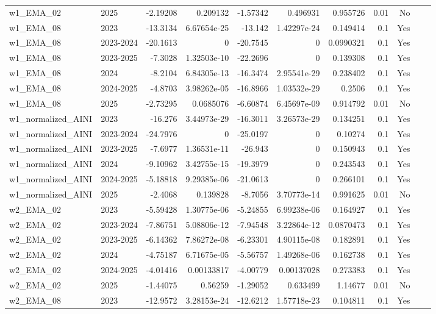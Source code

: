 \begin{longtable}{llrrrrrrrrl}
w1\_EMA\_02 & 2025 & -2.19208 & 0.209132 & -1.57342 & 0.496931 & 0.955726 & 0.01 & No \\
w1\_EMA\_08 & 2023 & -13.3134 & 6.67654e-25 & -13.142 & 1.42297e-24 & 0.149414 & 0.1 & Yes \\
w1\_EMA\_08 & 2023-2024 & -20.1613 & 0 & -20.7545 & 0 & 0.0990321 & 0.1 & Yes \\
w1\_EMA\_08 & 2023-2025 & -7.3028 & 1.32503e-10 & -22.2696 & 0 & 0.139308 & 0.1 & Yes \\
w1\_EMA\_08 & 2024 & -8.2104 & 6.84305e-13 & -16.3474 & 2.95541e-29 & 0.238402 & 0.1 & Yes \\
w1\_EMA\_08 & 2024-2025 & -4.8703 & 3.98262e-05 & -16.8966 & 1.03532e-29 & 0.2506 & 0.1 & Yes \\
w1\_EMA\_08 & 2025 & -2.73295 & 0.0685076 & -6.60874 & 6.45697e-09 & 0.914792 & 0.01 & No \\
w1\_normalized\_AINI & 2023 & -16.276 & 3.44973e-29 & -16.3011 & 3.26573e-29 & 0.134251 & 0.1 & Yes \\
w1\_normalized\_AINI & 2023-2024 & -24.7976 & 0 & -25.0197 & 0 & 0.10274 & 0.1 & Yes \\
w1\_normalized\_AINI & 2023-2025 & -7.6977 & 1.36531e-11 & -26.943 & 0 & 0.150943 & 0.1 & Yes \\
w1\_normalized\_AINI & 2024 & -9.10962 & 3.42755e-15 & -19.3979 & 0 & 0.243543 & 0.1 & Yes \\
w1\_normalized\_AINI & 2024-2025 & -5.18818 & 9.29385e-06 & -21.0613 & 0 & 0.266101 & 0.1 & Yes \\
w1\_normalized\_AINI & 2025 & -2.4068 & 0.139828 & -8.7056 & 3.70773e-14 & 0.991625 & 0.01 & No \\
w2\_EMA\_02 & 2023 & -5.59428 & 1.30775e-06 & -5.24855 & 6.99238e-06 & 0.164927 & 0.1 & Yes \\
w2\_EMA\_02 & 2023-2024 & -7.86751 & 5.08806e-12 & -7.94548 & 3.22864e-12 & 0.0870473 & 0.1 & Yes \\
w2\_EMA\_02 & 2023-2025 & -6.14362 & 7.86272e-08 & -6.23301 & 4.90115e-08 & 0.182891 & 0.1 & Yes \\
w2\_EMA\_02 & 2024 & -4.75187 & 6.71675e-05 & -5.56757 & 1.49268e-06 & 0.162738 & 0.1 & Yes \\
w2\_EMA\_02 & 2024-2025 & -4.01416 & 0.00133817 & -4.00779 & 0.00137028 & 0.273383 & 0.1 & Yes \\
w2\_EMA\_02 & 2025 & -1.44075 & 0.56259 & -1.29052 & 0.633499 & 1.14677 & 0.01 & No \\
w2\_EMA\_08 & 2023 & -12.9572 & 3.28153e-24 & -12.6212 & 1.57718e-23 & 0.104811 & 0.1 & Yes \\

\end{longtable}
